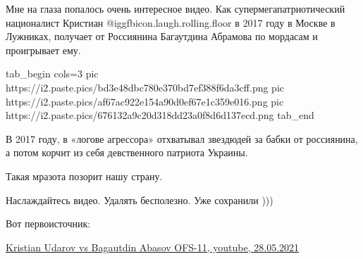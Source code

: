 Мне на глаза попалось очень интересное видео. Как супермегапатриотический
националист Кристиан  @igg{fbicon.laugh.rolling.floor}  в 2017 году в Москве в
Лужниках, получает от Россиянина Багаутдина Абрамова по мордасам и проигрывает
ему.


\ifcmt
  tab_begin cols=3
     pic https://i2.paste.pics/bd3e48dbc780e370bd7ef388f6da3cff.png
		 pic https://i2.paste.pics/af67ac922e154a90d0ef67e1c359e016.png
		 pic https://i2.paste.pics/676132a9c20d318dd23a0f8d6d137ecd.png
  tab_end
\fi

В 2017 году, в «логове агрессора» отхватывал звездюдей за бабки от россиянина,
а потом корчит из себя девственного патриота Украины. 

Такая мразота позорит нашу страну. 

Наслаждайтесь видео. Удалять бесполезно. Уже сохранили )))

Вот первоисточник: 

\href{https://youtu.be/o2B1e1eZoH0}{%
Kristian Udarov vs Bagautdin Abasov OFS-11, youtube, 28.05.2021%
}
